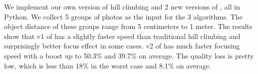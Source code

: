 We implement our own version of hill climbing and 2 new versions of \sysname, all in Python.
We collect 5 groups of photos as the input for the 3 algorithms.
The object distance of these groups range from 5 centimeters to 1 meter.
The results show that v1 of \sysname has a slightly faster speed than traditional hill climbing and surprisingly better focus effect in some cases.
v2 of \sysname has much faster focusing speed with a boost up to 50.3\% and 39.7\% on average.
The quality loss is pretty low, which is less than 18\% in the worst case and 8.1\% on average.
